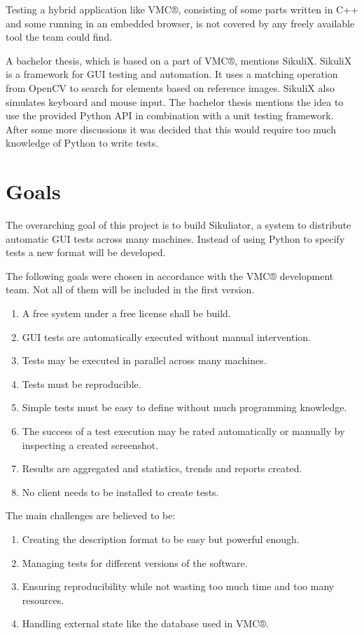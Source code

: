 \documentclass[a4paper,twocolumn]{article}
\newcommand{\VMC}[0]{VMC®}
\begin{document}
Testing a hybrid application like \VMC{}, consisting of some parts written in C++ and some running in an embedded browser, is not covered by any freely available tool the team could find.

A bachelor thesis\cite{BachelorMapViewer}, which is based on a part of \VMC{}, mentions SikuliX\cite{SikuliX}.
SikuliX is a framework for GUI testing and automation.
It uses a matching operation from OpenCV\cite{OpenCV} to search for elements based on reference images.
SikuliX also simulates keyboard and mouse input.
The bachelor thesis mentions the idea to use the provided Python API in combination with a unit testing framework.
After some more discussions it was decided that this would require too much knowledge of Python to write tests.

\section{Goals}
The overarching goal of this project is to build Sikuliator, a system to distribute automatic GUI tests across many machines.
Instead of using Python to specify tests a new format will be developed.


The following goals were chosen in accordance with the \VMC{} development team.
Not all of them will be included in the first version.
\begin{enumerate}
	\item A free system under a free license shall be build.
	\item GUI tests are automatically executed without manual intervention.
	\item Tests may be executed in parallel across many machines.
	\item Tests must be reproducible.
	\item Simple tests must be easy to define without much programming knowledge.
	\item The success of a test execution may be rated automatically or manually by inspecting a created screenshot.
	\item Results are aggregated and statistics, trends and reports created.
	\item No client needs to be installed to create tests.
\end{enumerate}



The main challenges are believed to be:
\begin{enumerate}
	\item Creating the description format to be easy but powerful enough.
	\item Managing tests for different versions of the software.
	\item Ensuring reproducibility while not wasting too much time and too many resources.
	\item Handling external state like the database used in \VMC{}.
\end{enumerate}
\end{document}
